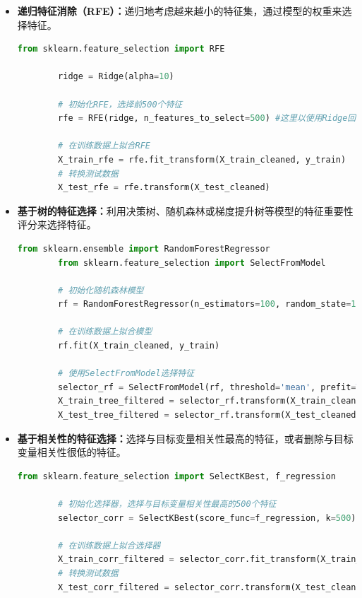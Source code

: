 \documentclass[
    report,     %
    oneside,    %
    UTF8,       %
    zihao=-4    %
]{config} %
\begin{document}
\begin{itemize}
    \item \textbf{递归特征消除（RFE）：}递归地考虑越来越小的特征集，通过模型的权重来选择特征。
    \begin{lstlisting}[label=code:recursive_feature_elimination, language=Python, caption=递归特征消除示例代码]
        from sklearn.feature_selection import RFE

        ridge = Ridge(alpha=10)
        
        # 初始化RFE，选择前500个特征
        rfe = RFE(ridge, n_features_to_select=500) #这里以使用Ridge回归模型的权重来选择特征为例
        
        # 在训练数据上拟合RFE
        X_train_rfe = rfe.fit_transform(X_train_cleaned, y_train)
        # 转换测试数据
        X_test_rfe = rfe.transform(X_test_cleaned)        
    \end{lstlisting}
    \item \textbf{基于树的特征选择：}利用决策树、随机森林或梯度提升树等模型的特征重要性评分来选择特征。
    \begin{lstlisting}[label=code:tree_based_feature_selection, language=Python, caption=基于树的特征选择示例代码]
        from sklearn.ensemble import RandomForestRegressor
        from sklearn.feature_selection import SelectFromModel
        
        # 初始化随机森林模型
        rf = RandomForestRegressor(n_estimators=100, random_state=111)
        
        # 在训练数据上拟合模型
        rf.fit(X_train_cleaned, y_train)
        
        # 使用SelectFromModel选择特征
        selector_rf = SelectFromModel(rf, threshold='mean', prefit=True)
        X_train_tree_filtered = selector_rf.transform(X_train_cleaned)
        X_test_tree_filtered = selector_rf.transform(X_test_cleaned)
    \end{lstlisting}
    \item \textbf{基于相关性的特征选择：}选择与目标变量相关性最高的特征，或者删除与目标变量相关性很低的特征。
    \begin{lstlisting}[label=code:correlation_based_feature_selection, language=Python, caption=基于相关性的特征选择示例代码]
        from sklearn.feature_selection import SelectKBest, f_regression

        # 初始化选择器，选择与目标变量相关性最高的500个特征
        selector_corr = SelectKBest(score_func=f_regression, k=500)
        
        # 在训练数据上拟合选择器
        X_train_corr_filtered = selector_corr.fit_transform(X_train_cleaned, y_train)
        # 转换测试数据
        X_test_corr_filtered = selector_corr.transform(X_test_cleaned)
    \end{lstlisting}
\end{itemize}
\end{document}
